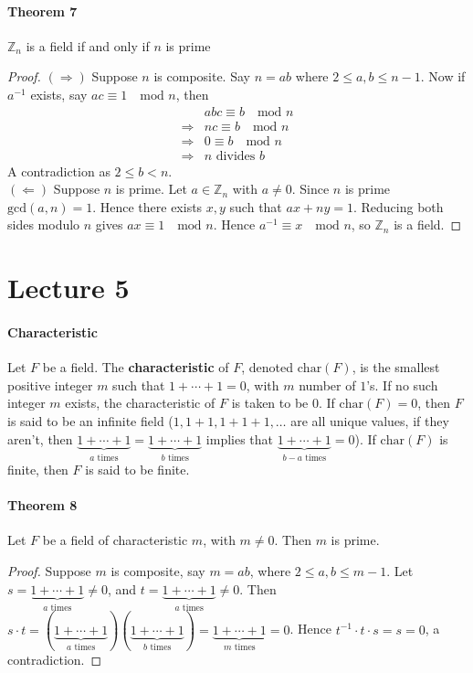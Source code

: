 \documentclass[10pt,letter]{article}
\theoremstyle{plain}
\theoremstyle{definition}
\begin{document}
\paragraph{Theorem 7}
    $\mathbb{Z}_n$ is a field if and only if $n$ is prime 
\begin{proof}
    $(\Rightarrow)$ Suppose $n$ is composite. Say $n=ab$ where $2\leq a,b\leq n-1$. Now if $a^{-1}$ exists, say $ac\equiv1\quad\text{mod }n$, then 
    \begin{align*}&abc\equiv b\quad\text{mod }n\\\Rightarrow &nc\equiv b\quad\text{mod }n\\\Rightarrow &0\equiv b\quad\text{mod }n\\\Rightarrow &n \text{ divides }b
    \end{align*} 
    A contradiction as $2\leq b<n$. \\ 
    $(\Leftarrow)$ Suppose $n$ is prime. Let $a\in\mathbb{Z}_n$ with $a\neq0$. Since $n$ is prime $\text{gcd}(a,n)=1$. Hence there exists $x,y$ such that $ax+ny=1$. Reducing both sides modulo $n$ gives $ax\equiv 1\quad\text{mod }n$. Hence $a^{-1}\equiv x\quad\text{mod }n$, so $\mathbb{Z}_n$ is a field. 
\end{proof}


\section*{Lecture 5}
\paragraph{Characteristic}
Let $F$ be a field. The \textbf{characteristic} of $F$, denoted $\text{char}(F)$, is the smallest positive integer $m$ such that $1+\cdots+1=0$, with $m$ number of $1$'s. If no such integer $m$ exists, the characteristic of $F$ is taken to be $0$. If $\text{char}(F)=0$, then $F$ is said to be an infinite field ($1,1+1,1+1+1,\ldots$ are all unique values, if they aren't, then $\underbrace{1+\cdots+1}_{a\text{ times}}=\underbrace{1+\cdots+1}_{b\text{ times}}$ implies that $\underbrace{1+\cdots+1}_{b-a\text{ times}}=0$). If $\text{char}(F)$ is finite, then $F$ is said to be finite. 
\paragraph{Theorem 8}
Let $F$ be a field of characteristic $m$, with $m\neq0$. Then $m$ is prime. 
\begin{proof}
Suppose $m$ is composite, say $m=ab$, where $2\leq a,b\leq m-1$. Let $s=\underbrace{1+\cdots+1}_{a\text{ times}}\neq0$, and $t=\underbrace{1+\cdots+1}_{a\text{ times}}\neq0$. Then $s\cdot t=(\underbrace{1+\cdots+1}_{a\text{ times}})(\underbrace{1+\cdots+1}_{b\text{ times}})=\underbrace{1+\cdots+1}_{m\text{ times}}=0$. Hence $t^{-1}\cdot t\cdot s=s=0$, a contradiction. 
\end{proof}
\end{document}
